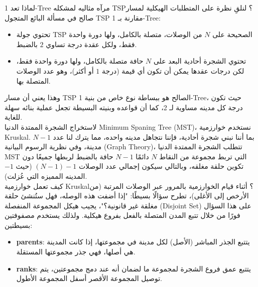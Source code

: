 \documentclass{article}
\newcommand{\en}[1]{\textenglish{#1}}
\begin{document}
لماذا تعد \en{1-Tree} مرآه مثاليه لمشكله \en{TSP}؟ لنلقِ نظرة على المتطلبات الهيكلية لمسار صالح في مسألة البائع المتجول \en{TSP} مقارنة بـ \en{1-Tree}:\\

	\begin{itemize}
		\item تحتوي جولة \en{TSP} الصحيحة على $N$ من الوصلات، متصلة بالكامل، ولها دورة واحدة فقط، ولكل عقدة درجة تساوي $2$ بالضبط.\\

		\item تحتوي الشجرة أحادية البعد على $N$ حافة متصلة بالكامل، ولها دورة واحدة فقط، لكن درجات عقدها يمكن أن تكون أي قيمة (درجة $1$ أو أكثر)، وهو عدد الوصلات المتصلة بها.\\
	\end{itemize}

وهذا يعني أن مسار \en{TSP} الصالح هو ببساطة نوع خاص من بنية \en{1-Tree}، حيث تكون درجة كل مدينه مساوية لـ 2، كما أن قواعده وبنيته البسيطة تجعل عملية بنائه سهلة للغاية.\\

لاستخراج الشجرة الممتدة الدنيا \en{Minimum Spaning Tree (MST)}، نستخدم خوارزمية \en{Kruskal}. بما أننا نبني شجرة أحادية، فإننا نتجاهل مدينه واحده، مما يترك لنا عدد $N-1$ مدينة، وفي نظرية الرسوم البيانية (\en{Graph Theory})، تتطلب الشجرة الممتدة الدنيا \en{MST} التي تربط مجموعة من النقاط $N$ دائمًا $N-1$ حافة بالضبط لربطها جميعًا دون تكوين حلقة مغلقه، وبالتالي سيكون إجمالي عدد الوصلات $(N-1)-1$ (حيث $-1$ المدينه المميزه التي عُزلت).\\

كيف تعمل خوارزمية \en{Kruskal}؟ أثناء قيام الخوارزمية بالمرور عبر الوصلات المرتبة (من الأرخص إلى الأغلى)، تطرح سؤالًا بسيطًا: "إذا أضفت هذه الوصله، فهل ستُنشئ حلقة مغلقة غير قانونية؟"، يجيب هيكل المجموعة المنفصلة (\en{Disjoint Set}) على هذا السؤال فورًا من خلال تتبع المدن المتصلة بالفعل بفروع هيكلية. ولذلك يستخدم مصفوفتين بسيطتين:\\

	\begin{itemize}
		\item \textbf{\en{parents}}:
يتتبع الجذر المباشر (الأصل) لكل مدينة في مجموعتها، إذا كانت المدينة هي أصلها، فهي جذر مجموعتها المستقلة.

		\item \textbf{\en{ranks}}:
يتتبع عمق فروع الشجرة لمجموعة ما لضمان أنه عند دمج مجموعتين، يتم توصيل المجموعة الأقصر أسفل المجموعة الأطول.
	\end{itemize}
\end{document}
